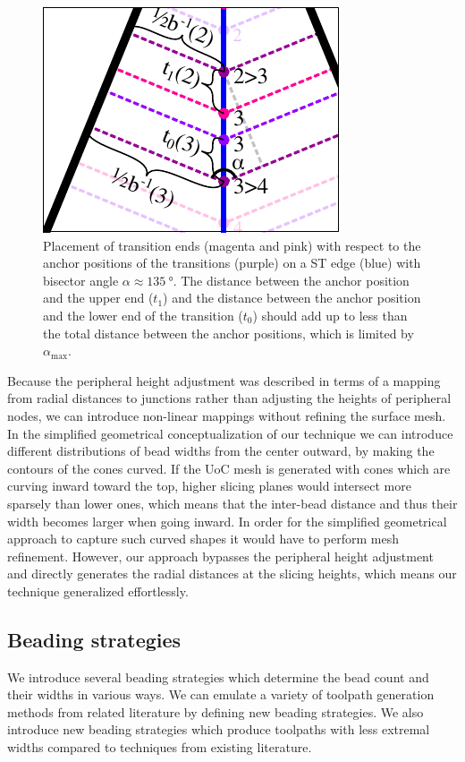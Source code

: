 \begin{figure}
\centering
\includegraphics[width=.4\columnwidth]{sources/method/transition_length_limit.pdf}
\caption{
Placement of transition ends (magenta and pink) with respect to the anchor positions of the transitions (purple) on a ST edge (blue) with bisector angle $\alpha \approx \SI{135}{\degree}$.
The distance between the anchor position and the upper end ($t_1$) and the distance between the anchor position and the lower end of the transition ($t_0$) should add up to less than the total distance between the anchor positions, which is limited by $\alpha_\text{max}$.
}
\label{transition_placement}
\end{figure}


Because the peripheral height adjustment was described in terms of a mapping from radial distances to junctions rather than adjusting the heights of peripheral nodes,
we can introduce non-linear mappings without refining the surface mesh.
In the simplified geometrical conceptualization of our technique we can introduce different distributions of bead widths from the center outward, by making the contours of the cones curved.
If the UoC mesh is generated with cones which are curving inward toward the top, higher slicing planes would intersect more sparsely than lower ones, which means that the inter-bead distance and thus their width becomes larger when going inward.
In order for the simplified geometrical approach to capture such curved shapes it would have to perform mesh refinement.
However, our approach bypasses the peripheral height adjustment and directly generates the radial distances at the slicing heights, which means our technique generalized effortlessly.




\subsection{Beading strategies}
We introduce several beading strategies which determine the bead count and their widths in various ways.
We can emulate a variety of toolpath generation methods from related literature by defining new beading strategies.
We also introduce new beading strategies which produce toolpaths with less extremal widths compared to techniques from existing literature.

